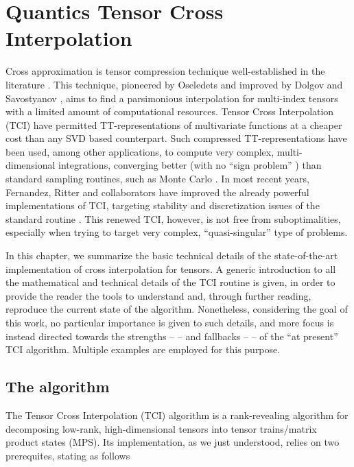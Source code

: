 \chapter{Quantics Tensor Cross Interpolation}
\label{chap:QTCI}

Cross approximation is tensor compression technique well-established in the literature \cite{Oseledets2010, Dolgov2020, Savostyanov2011, Savostyanov2014, Fernandez2022, Fernandez2024}. This technique, pioneered by Oseledets \cite{Oseledets2010} and improved by Dolgov and Savostyanov \cite{Dolgov2020}, aims to find a parsimonious interpolation for multi-index tensors with a limited amount of computational resources. Tensor Cross Interpolation (TCI) have permitted TT-representations of multivariate functions at a cheaper cost than any SVD based counterpart. Such compressed TT-representations have been used, among other applications, to compute very complex, multi-dimensional integrations, converging better (with no ``sign problem'' \cite{Loh1990}) than standard sampling routines, such as Monte Carlo \cite{Fernandez2022, Dolgov2020}. In most recent years, Fernandez, Ritter and collaborators have improved the already powerful implementations of TCI, targeting stability and discretization issues of the standard routine \cite{Fernandez2024}. This renewed TCI, however, is not free from suboptimalities, especially when trying to target very complex, ``quasi-singular'' type of problems. 

In this chapter, we summarize the basic technical details of the state-of-the-art implementation of cross interpolation for tensors. A generic introduction to all the mathematical and technical details of the TCI routine is given, in order to provide the reader the tools to understand and, through further reading, reproduce the current state of the algorithm. Nonetheless, considering the goal of this work, no particular importance is given to such details, and more focus is instead directed towards the strengths --  -- and fallbacks --  -- of the ``at present'' TCI algorithm. Multiple examples are employed for this purpose.

\section{The algorithm}
\label{sec:TCIalgorithm}

The Tensor Cross Interpolation (TCI) algorithm is a rank-revealing algorithm for decomposing low-rank, high-dimensional tensors into tensor trains/matrix product states (MPS). Its implementation, as we just understood, relies on two prerequites, stating as follows

